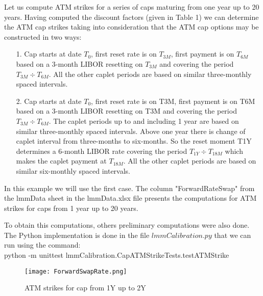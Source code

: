 \documentclass[11pt]{article}
\numberwithin{equation}{subsection}
\begin{document}
Let us compute ATM strikes for a series of caps maturing from one year up to 20 years. Having computed the discount factors (given in Table 1) we can determine the ATM cap strikes taking into consideration that the ATM cap options may be constructed in two ways:

\begin{enumerate}
	\item [1.] Cap starts at date \(T_0\), first reset rate is on \(T_{3M}\), first payment is on \(T_{6M}\) based on a 3-month
	LIBOR resetting on \(T_{3M}\) and covering the period \(T_{3M} \div T_{6M}\). All the other caplet periods are based on similar three-monthly spaced intervals.
	\item [2.] Cap starts at date \(T_0\), first reset rate is on T3M, first payment is on T6M based on a 3-month LIBOR resetting on T3M and covering the period \(T_{3M} \div T_{6M}\). The caplet periods up to and including 1 year are based on similar three-monthly spaced intervals. Above one year there is change of caplet interval from three-months to six-months. So the reset moment T1Y determines a 6-month LIBOR rate covering the period \(T_{1Y} \div T_{18M}\) which makes the caplet payment at \(T_{18M}\). All the other caplet periods are based on similar six-monthly spaced intervals.
\end{enumerate}
In this example we will use the first case.
The column "ForwardRateSwap" from the lmmData sheet in the lmmData.xlsx file presents the computations for ATM strikes for caps from 1 year up to 20 years.

To obtain this computations, others preliminary computations were also done. 
The Python implementation is done in the file \(lmmCalibration.py\) that we can run using the command:\\ 
python -m unittest lmmCalibration.CapATMStrikeTests.testATMStrike

\begin{figure}[H]
	\texttt{[image: ForwardSwapRate.png]}
    \caption{ATM strikes for cap from 1Y up to 2Y}
\end{figure}
\end{document}
